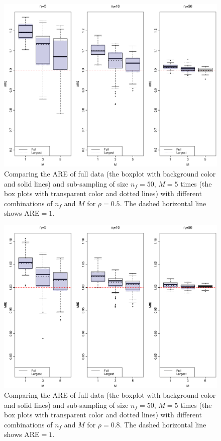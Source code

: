 \documentclass[11pt,a5paper,twoside]{book}
\begin{document}
\begin{figure}[!t]
\centering
\includegraphics[width=\textwidth]{fig_05.eps}
\caption[Comparing the ARE of full data and sub-sampling of size $n_f=50$, $M=5$ times with different combinations of $n_f$ and $M$ for $\rho=0.5$.]{Comparing the ARE of full data (the boxplot with background color and solid lines) and sub-sampling of size $n_f=50$, $M=5$ times (the box plots with transparent color and dotted lines) with different combinations of $n_f$ and $M$ for $\rho=0.5$. The dashed horizontal line shows ARE$=1$.} 
\label{fig_05}
\end{figure}  
\begin{figure}[!t]
\centering
\includegraphics[width=\textwidth]{fig_08.eps}
\caption[Comparing the ARE of full data and sub-sampling of size $n_f=50$, $M=5$ times with different combinations of $n_f$ and $M$ for $\rho=0.8$.]{Comparing the ARE of full data (the boxplot with background color and solid lines) and sub-sampling of size $n_f=50$, $M=5$ times (the box plots with transparent color and dotted lines) with different combinations of $n_f$ and $M$ for $\rho=0.8$. The dashed horizontal line shows ARE$=1$.} 
\label{fig_08}
\end{figure}  
\end{document}
